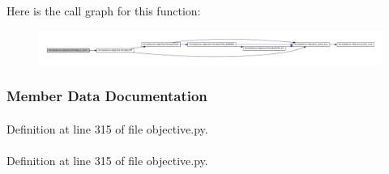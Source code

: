 \-Here is the call graph for this function\-:\nopagebreak
\begin{figure}[H]
\begin{center}
\leavevmode
\includegraphics[width=350pt]{classforcebalance_1_1objective_1_1Penalty_ab59d5beafbab0918b7c3e0c61ece41a3_cgraph}
\end{center}
\end{figure}




\subsubsection{\-Member \-Data \-Documentation}
\hypertarget{classforcebalance_1_1objective_1_1Penalty_a27d10ae4d7dc4691170456ca7c2208c7}{
\paragraph[{a}]{}}\label{classforcebalance_1_1objective_1_1Penalty_a27d10ae4d7dc4691170456ca7c2208c7}


\-Definition at line 315 of file objective.\-py.

\hypertarget{classforcebalance_1_1objective_1_1Penalty_a90c9d0618d160aac6d2b30643087eb1c}{
\paragraph[{b}]{}}\label{classforcebalance_1_1objective_1_1Penalty_a90c9d0618d160aac6d2b30643087eb1c}


\-Definition at line 315 of file objective.\-py.

\hypertarget{classforcebalance_1_1objective_1_1Penalty_a29f26a2c093d2bff5514e246130d6a53}{
\paragraph[{fadd}]{}}\label{classforcebalance_1_1objective_1_1Penalty_a29f26a2c093d2bff5514e246130d6a53}


